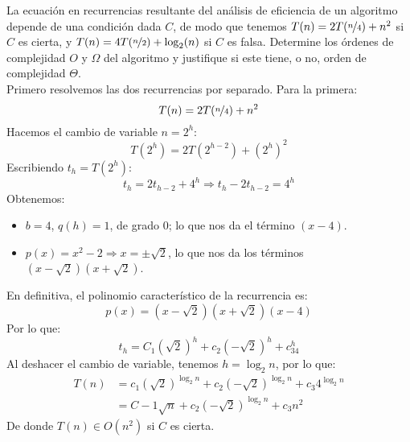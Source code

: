 \documentclass[12pt]{article}
\begin{document}
    \newpage
    \setcounter{ejercicio}{0}

    \begin{ejercicio}[2 puntos]
        La ecuación en recurrencias resultante del análisis de eficiencia de un algoritmo depende de una condición dada $C$, de modo que tenemos $T(n) = 2T(\nicefrac{n}{4}) + n^2$ si $C$ es cierta, y $T(n) = 4T(\nicefrac{n}{2}) + \log_2(n)$ si $C$ es falsa. Determine los órdenes de complejidad $O$ y $\Omega$ del algoritmo y justifique si este tiene, o no, orden de complejidad $\Theta$.\\

        \noindent
        Primero resolvemos las dos recurrencias por separado. Para la primera:
        \begin{equation*}
            T(n) = 2T(\nicefrac{n}{4}) + n^2
        \end{equation*}
        Hacemos el cambio de variable $n = 2^h$:
        \begin{equation*}
            T\left(2^h\right) = 2T\left(2^{h-2}\right) + {\left(2^h\right)}^{2}
        \end{equation*}
        Escribiendo $t_h = T(2^h)$:
        \begin{equation*}
            t_h = 2t_{h-2} + 4^h \Longrightarrow t_h - 2t_{h-2} = 4^h
        \end{equation*}
        Obtenemos:
        \begin{itemize}
            \item $b = 4$, $q(h) = 1$, de grado 0; lo que nos da el término $(x-4)$.
            \item $p(x) = x^2-2 \Longrightarrow x = \pm \sqrt{2}$, lo que nos da los términos $\left(x-\sqrt{2}\right)\left(x+\sqrt{2}\right)$.
        \end{itemize}
        En definitiva, el polinomio característico de la recurrencia es:
        \begin{equation*}
            p(x) = \left(x-\sqrt{2}\right)\left(x+\sqrt{2}\right)(x-4)
        \end{equation*}
        Por lo que:
        \begin{equation*}
            t_h = C_1{\left(\sqrt{2}\right)}^{h} + c_2 {\left(-\sqrt{2}\right)}^{h} + c_34^h
        \end{equation*}
        Al deshacer el cambio de variable, tenemos $h = \log_2n$, por lo que:
        \begin{align*}
            T(n) &= c_1 {\left(\sqrt{2}\right)}^{\log_2n} + c_2 {\left(-\sqrt{2}\right)}^{\log_2n} + c_3 4^{\log_2n} \\
                 &= C-1 \sqrt{n} + c_2 {\left(-\sqrt{2}\right)}^{\log_2n} + c_3n^2
        \end{align*}
        De donde $T(n) \in O(n^2)$ si $C$ es cierta.\\


\end{ejercicio}
\end{document}
